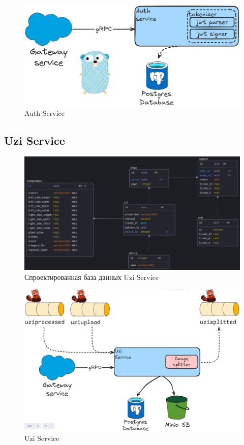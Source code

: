 \begin{figure}[H]%
	\begin{center}
		\includegraphics[width=.7\columnwidth]{./img/auth_service.png}%
	\end{center}
	\caption{Auth Service}%
	\label{pic:auth_model}%
\end{figure}

\subsection{Uzi Service}
\begin{figure}[H]%
	\begin{center}
		\includegraphics[width=.7\columnwidth]{./img/uzi_db.png}%
	\end{center}
	\caption{Спроектированная база данных Uzi Service}%
	\label{pic:auth_model}%
\end{figure}


\begin{figure}[H]%
	\begin{center}
		\includegraphics[width=.7\columnwidth]{./img/uzi_service.png}%
	\end{center}
	\caption{Uzi Service}%
	\label{pic:auth_model}%
\end{figure}

